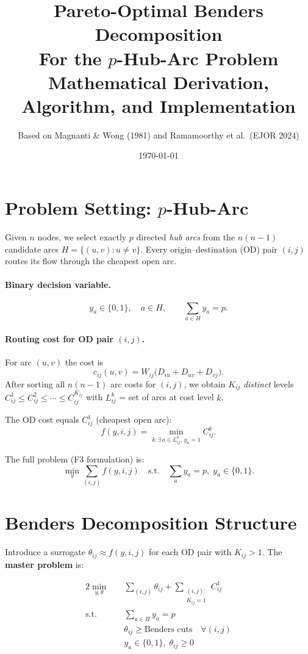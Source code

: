 \documentclass[12pt,a4paper]{article}
\title{\textbf{Pareto-Optimal Benders Decomposition} \\[0.5em]
       \large For the $p$-Hub-Arc Problem \\[0.3em]
       \normalsize Mathematical Derivation, Algorithm, and Implementation}
\author{Based on Magnanti \& Wong (1981) and Ramamoorthy et al.\ (EJOR 2024)}
\date{\today}
\begin{document}
\maketitle
\tableofcontents
\newpage

\section{Problem Setting: $p$-Hub-Arc}

Given $n$ nodes, we select exactly $p$ directed \emph{hub arcs} from the
$n(n-1)$ candidate arcs $H = \{(u,v) : u \neq v\}$.  Every
origin--destination (OD) pair $(i,j)$ routes its flow through the cheapest
open arc.

\paragraph{Binary decision variable.}
$$y_a \in \{0,1\}, \quad a \in H, \qquad \sum_{a \in H} y_a = p.$$

\paragraph{Routing cost for OD pair $(i,j)$.}
For arc $(u,v)$ the cost is
$$c_{ij}(u,v) = W_{ij}\bigl(D_{iu}+D_{uv}+D_{vj}\bigr).$$
After sorting all $n(n{-}1)$ arc costs for $(i,j)$, we obtain
$K_{ij}$ \emph{distinct} levels $C^1_{ij} \le C^2_{ij} \le \cdots \le C^{K_{ij}}_{ij}$
with $L^k_{ij}$ = set of arcs at cost level $k$.

The OD cost equals $C^1_{ij}$ (cheapest open arc):
$$f(y, i, j) = \min_{k : \exists\, a \in L^k_{ij},\, y_a=1} C^k_{ij}.$$

The full problem (F3 formulation) is:
$$\min_{y} \sum_{(i,j)} f(y,i,j) \quad \text{s.t.} \quad \sum_a y_a = p,\; y_a \in \{0,1\}.$$

\section{Benders Decomposition Structure}

Introduce a surrogate $\theta_{ij} \approx f(y,i,j)$ for each OD pair with
$K_{ij} > 1$.  The \textbf{master problem} is:

\begin{alignat}{2}
\min_{y,\theta}\quad & \sum_{(i,j)} \theta_{ij} + \sum_{\substack{(i,j):\\K_{ij}=1}} C^1_{ij}\\
\text{s.t.}\quad & \sum_{a \in H} y_a = p \label{eq:p}\\
                 & \theta_{ij} \ge \text{Benders cuts} \quad \forall (i,j)\\
                 & y_a \in \{0,1\},\; \theta_{ij} \ge 0
\end{alignat}
\end{document}
